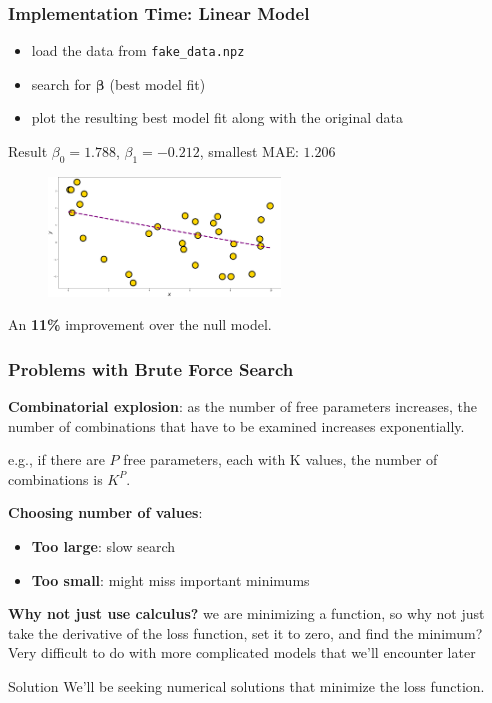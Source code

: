 \documentclass{beamer}
\begin{document}
\begin{frame}
\frametitle{Implementation Time: Linear Model}

\begin{itemize}
\item load the data from \texttt{fake\_data.npz} 
\item search for $\boldsymbol{\beta}$ (best model fit)
\item plot the resulting best model fit along with the original data
\end{itemize}

\begin{exampleblock}{Result}
$\beta_0 = 1.788$, $\beta_1 =  -0.212$, smallest MAE: $1.206$
 \end{exampleblock}


\begin{figure}
\includegraphics[width=0.55\textwidth]{../figures/best_linear.png}
\end{figure}

An \textbf{11\%} improvement over the null model.


\end{frame}

\begin{frame}
\frametitle{Problems with Brute Force Search}

\textbf{Combinatorial explosion}: as the number of free parameters increases, the number of combinations that have to be examined increases exponentially.

e.g., if there are $P$ free parameters, each with K values, the number of combinations is $K^P$.


\textbf{Choosing number of values}:
\begin{itemize}
\item \textbf{Too large}: slow search
\item \textbf{Too small}: might miss important minimums
\end{itemize}


\textbf{Why not just use calculus?} we are minimizing a function, so why not just take the derivative of the loss function, set it to zero, and find the minimum? 
\alert{Very difficult to do with more complicated models that we'll encounter later}

\begin{block}{Solution} 
We'll be seeking numerical solutions that minimize the loss function.
\end{block}

\end{frame}
\end{document}
